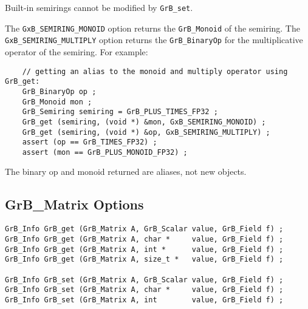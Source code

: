 Built-in semirings cannot be modified by \verb'GrB_set'.

The \verb'GxB_SEMIRING_MONOID' option returns the \verb'GrB_Monoid' of the
semiring.  The \verb'GxB_SEMIRING_MULTIPLY' option returns the
\verb'GrB_BinaryOp' for the multiplicative operator of the semiring.  For
example:

    {\footnotesize
    \begin{verbatim}
    // getting an alias to the monoid and multiply operator using GrB_get:
    GrB_BinaryOp op ;
    GrB_Monoid mon ;
    GrB_Semiring semiring = GrB_PLUS_TIMES_FP32 ;
    GrB_get (semiring, (void *) &mon, GxB_SEMIRING_MONOID) ;
    GrB_get (semiring, (void *) &op, GxB_SEMIRING_MULTIPLY) ;
    assert (op == GrB_TIMES_FP32) ;
    assert (mon == GrB_PLUS_MONOID_FP32) ; \end{verbatim} }

The binary op and monoid returned are aliases, not new objects.

\newpage
\subsection{{\sf GrB\_Matrix} Options}
\label{get_set_matrix}

\begin{mdframed}[userdefinedwidth=6in]
{\footnotesize
\begin{verbatim}
GrB_Info GrB_get (GrB_Matrix A, GrB_Scalar value, GrB_Field f) ;
GrB_Info GrB_get (GrB_Matrix A, char *     value, GrB_Field f) ;
GrB_Info GrB_get (GrB_Matrix A, int *      value, GrB_Field f) ;
GrB_Info GrB_get (GrB_Matrix A, size_t *   value, GrB_Field f) ;

GrB_Info GrB_set (GrB_Matrix A, GrB_Scalar value, GrB_Field f) ;
GrB_Info GrB_set (GrB_Matrix A, char *     value, GrB_Field f) ;
GrB_Info GrB_set (GrB_Matrix A, int        value, GrB_Field f) ;
\end{verbatim}
}\end{mdframed}

